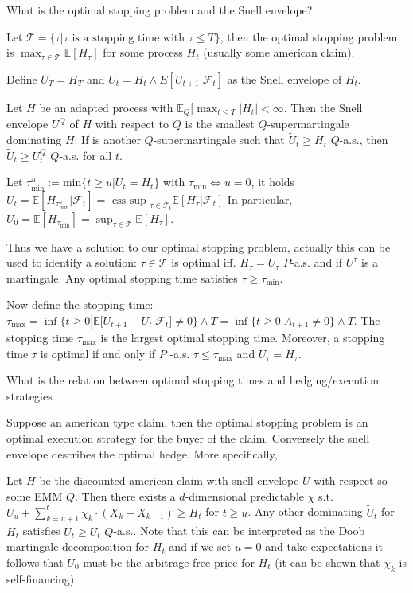 What is the optimal stopping problem and the Snell envelope?

Let \( \mathcal{T} = \{\tau | \tau \text{ is a stopping time with } \tau \leq T\} \),
then the optimal stopping problem is
\( \max_{\tau \in \mathcal{T}} \mathbb{E}[H_\tau] \)
for some process \( H_t \) (usually some american claim).

Define \( U_T = H_T \) and \( U_t = H_t \wedge E[U_{t+1}|\mathcal{F}_t] \)
as the Snell envelope of \( H_t \).

Let \( H \) be an adapted process with \( \mathbb{E}_Q[\max_{t \leq T} |H_t| < \infty \). 
Then the Snell envelope \( U^Q \) of \( H \) with respect to \( Q \) is the smallest \( Q \)-supermartingale dominating \( H \):
If is another \( Q \)-supermartingale such that \( \tilde{U}_t \geq H_t \) \( Q \)-a.s., then \( \tilde{U}_t \geq U_t^Q \) \( Q \)-a.s. 
for all \( t \).

Let \( \tau^{u}_{\text{min}} := \text{min}\{t \geq u| U_t = H_t\}\) with \( \tau_{\text{min}} \iff u = 0 \), it holds
\( U_t = \mathbb{E}[H_{\tau^{u}_{\text{min}}}|\mathcal{F}_t] = \text{ ess sup }_{\tau \in \mathcal{T}_t} \mathbb{E}[H_\tau | \mathcal{F}_t ] \)
In particular, \( U_0 = \mathbb{E}[H_{\tau_{\text{min}}}] = \sup_{\tau \in \mathcal{T}} \mathbb{E}[H_\tau] \).

Thus we have a solution to our optimal stopping problem, actually this can be used to identify a solution: 
\( \tau \in \mathcal{T} \) is optimal iff. \( H_\tau = U_\tau \) \( P \)-a.s. and if \( U^\tau \) is a martingale.
Any optimal stopping time satisfies \( \tau \geq \tau_{\text{min}} \).

Now define the stopping time:
\( \tau_{\text{max}} = \inf \{ t \geq 0 | \mathbb{E}[U_{t+1} - U_t|\mathcal{F}_t] \neq 0 \} \wedge T = \inf \{t \geq 0 | A_{t+1} \neq 0 \} \wedge T \).
The stopping time \( \tau_{\text{max}} \) is the largest optimal stopping time. Moreover, a stopping time \( \tau \) is optimal if and only if \( P \) -a.s. 
\( \tau \leq \tau_{\text{max}} \) and \( U_\tau = H_\tau \).



What is the relation between optimal stopping times and hedging/execution strategies

Suppose an american type claim, then the optimal stopping problem is an optimal execution strategy for the buyer
of the claim. Conversely the snell envelope describes the optimal hedge.
More specifically,

Let \( H \) be the discounted american claim with snell envelope \( U \) with respect so some EMM \( Q \). Then there exists a \( d \)-dimensional predictable \( \chi \) 
s.t. 
\( U_u + \sum_{k=u+1}^t \chi_k \cdot (X_k - X_{k-1}) \geq H_t \) for \( t \geq u \). 
Any other dominating \( \tilde{U}_t \) for \( H_t \) satisfies \( \tilde{U}_t \geq U_t \) \( Q \)-a.s..
Note that this can be interpreted as the Doob martingale decomposition for \( H_t \) and if we set \( u = 0 \) and take expectations it follows 
that \( U_0 \) must be the arbitrage free price for \( H_t \) (it can be shown that \( \chi_k \) is self-financing).

